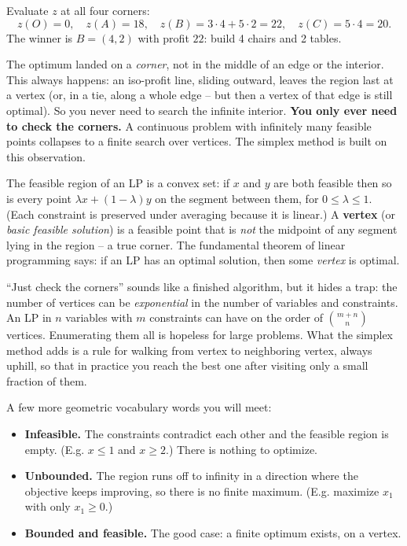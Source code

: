 Evaluate $z$ at all four corners:
\[
z(O)=0,\quad z(A)=18,\quad z(B)=3\cdot4+5\cdot2=22,\quad z(C)=5\cdot4=20.
\]
The winner is $B=(4,2)$ with profit $\boxed{22}$: build 4 chairs and 2 tables.

\begin{intuitionbox}
The optimum landed on a \emph{corner}, not in the middle of an edge or
the interior. This always happens: an iso-profit line, sliding outward, leaves the
region last at a vertex (or, in a tie, along a whole edge -- but then a vertex
of that edge is still optimal). So you never need to search the infinite
interior. \textbf{You only ever need to check the corners.} A continuous
problem with infinitely many feasible points collapses to a finite search over
vertices. The simplex method is built on this observation.
\end{intuitionbox}

\begin{formalbox}
The feasible region of an LP is a convex set: if $x$ and $y$ are both feasible
then so is every point $\lambda x + (1-\lambda)y$ on the segment between them,
for $0 \le \lambda \le 1$. (Each constraint is preserved under averaging
because it is linear.) A \textbf{vertex} (or \emph{basic feasible solution}) is
a feasible point that is \emph{not} the midpoint of any segment lying in the
region -- a true corner. The fundamental theorem of linear programming says: if
an LP has an optimal solution, then some \emph{vertex} is optimal.
\end{formalbox}

\begin{trapbox}
``Just check the corners'' sounds like a finished algorithm, but it hides a
trap: the number of vertices can be \emph{exponential} in the number of
variables and constraints. An LP in $n$ variables with $m$ constraints can have
on the order of $\binom{m+n}{n}$ vertices. Enumerating them all is hopeless for
large problems. What the simplex method adds is a rule for walking from vertex to neighboring
vertex, always uphill, so that in practice you reach the best one after visiting
only a small fraction of them.
\end{trapbox}

A few more geometric vocabulary words you will meet:
\begin{itemize}
\item \textbf{Infeasible.} The constraints contradict each other and the
  feasible region is empty. (E.g. $x \le 1$ and $x \ge 2$.) There is nothing to
  optimize.
\item \textbf{Unbounded.} The region runs off to infinity in a direction where
  the objective keeps improving, so there is no finite maximum. (E.g. maximize
  $x_1$ with only $x_1 \ge 0$.)
\item \textbf{Bounded and feasible.} The good case: a finite optimum exists, on
  a vertex.
\end{itemize}

